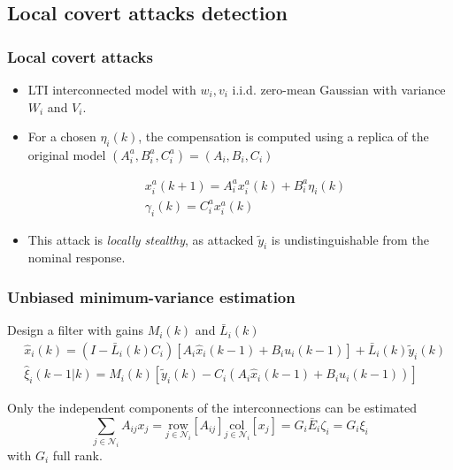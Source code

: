 \documentclass[presentation]{beamer}
\newcommand{\NN}{{\mathcal{N}}}
\newcommand{\col}[1]{\underset{{#1}}{\mathrm{col}}}
\newcommand{\row}[1]{\underset{{#1}}{\mathrm{row}}}
\begin{document}
\subsection{Local covert attacks detection}

\begin{frame}
	\frametitle{Local covert attacks}

	\begin{itemize}
		\setlength{\itemsep}{2ex}
		\item<1-> LTI interconnected model with $w_i, v_i$ i.i.d. zero-mean Gaussian with variance $W_i$ and $V_i$.
		
		\item<2-> For a chosen $\eta_i(k)$, the compensation is computed using a replica of the original model $(A_i^a, B_i^a, C_i^a) = (A_i,B_i,C_i)$
		
		\begin{equation*}
			\begin{aligned}
				&x^{a}_i(k+1) = A^a_i x^a_i(k) + B^a_i \eta_i(k) \\
				&\gamma_i(k) = C^a_i x^a_i(k) \,
			\end{aligned}
		\end{equation*}

		\item<3> This attack is \emph{locally stealthy}, as attacked $\tilde y_i$ is undistinguishable from the nominal response.
	\end{itemize}
\end{frame}

\begin{frame}
	\frametitle{Unbiased minimum-variance estimation}
	Design a filter with gains $M_i(k)$ and $\bar L_i(k)$
	\begin{align*}
		&\hat{x}_i(k) =  (I - \bar L_i(k)C_i)\left[A_i\hat{x}_i(k-1) + B_i u_i(k-1)\right] +\bar L_i(k) \tilde y_i(k) \\
		&\hat{\xi}_i(k-1|k) = M_i(k)\left[\tilde{y}_i(k) - C_i \left(A_i\hat{x}_i(k-1) + B_i u_i(k-1)	\right) \right]
	\end{align*}
	
	\vfill
	Only the independent components of the interconnections can be estimated
	$$
		\sum_{j\in\mathcal{N}_i}A_{ij} x_j = \row{j\in\NN_i}\left[A_{ij}\right]\col{j\in\NN_i}\left[x_j\right] = G_i \bar{E}_i \zeta_i = G_i \xi_i
	$$
	with $G_i$ full rank.
\end{frame}
\end{document}
